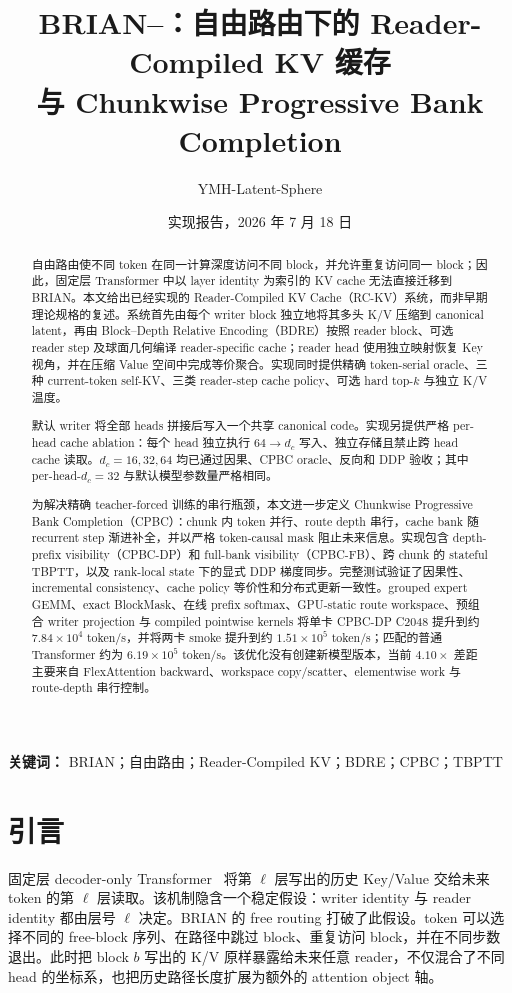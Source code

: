\documentclass[UTF8,twocolumn,10pt,a4paper]{ctexart}
\title{\vspace{-1.0em}\textbf{BRIAN--\RCKV{}：自由路由下的 Reader-Compiled KV 缓存\\与 Chunkwise Progressive Bank Completion}}
\author{YMH-Latent-Sphere}
\date{实现报告，2026 年 7 月 18 日}
\newcommand{\RCKV}{\textsf{RC-KV}}
\newcommand{\BDRE}{\textsf{BDRE}}
\newcommand{\CPBC}{\textsf{CPBC}}
\newcommand{\DP}{\textsf{CPBC-DP}}
\newcommand{\FB}{\textsf{CPBC-FB}}
\begin{document}
\maketitle
\vspace{-1.55em}

\begin{abstract}
自由路由使不同 token 在同一计算深度访问不同 block，并允许重复访问同一 block；因此，固定层 Transformer 中以 layer identity 为索引的 KV cache 无法直接迁移到 BRIAN。本文给出已经实现的 Reader-Compiled KV Cache（\RCKV{}）系统，而非早期理论规格的复述。系统首先由每个 writer block 独立地将其多头 K/V 压缩到 canonical latent，再由 Block--Depth Relative Encoding（\BDRE{}）按照 reader block、可选 reader step 及球面几何编译 reader-specific cache；reader head 使用独立映射恢复 Key 视角，并在压缩 Value 空间中完成等价聚合。实现同时提供精确 token-serial oracle、三种 current-token self-KV、三类 reader-step cache policy、可选 hard top-$k$ 与独立 K/V 温度。

默认 writer 将全部 heads 拼接后写入一个共享 canonical code。实现另提供严格 per-head cache ablation：每个 head 独立执行 $64\rightarrow d_c$ 写入、独立存储且禁止跨 head cache 读取。$d_c=16,32,64$ 均已通过因果、CPBC oracle、反向和 DDP 验收；其中 per-head-$d_c=32$ 与默认模型参数量严格相同。

为解决精确 teacher-forced 训练的串行瓶颈，本文进一步定义 Chunkwise Progressive Bank Completion（\CPBC{}）：chunk 内 token 并行、route depth 串行，cache bank 随 recurrent step 渐进补全，并以严格 token-causal mask 阻止未来信息。实现包含 depth-prefix visibility（\DP{}）和 full-bank visibility（\FB{}）、跨 chunk 的 stateful TBPTT，以及 rank-local state 下的显式 DDP 梯度同步。完整测试验证了因果性、incremental consistency、cache policy 等价性和分布式更新一致性。grouped expert GEMM、exact BlockMask、在线 prefix softmax、GPU-static route workspace、预组合 writer projection 与 compiled pointwise kernels 将单卡 \DP{} C2048 提升到约 $7.84\times10^4$ token/s，并将两卡 smoke 提升到约 $1.51\times10^5$ token/s；匹配的普通 Transformer 约为 $6.19\times10^5$ token/s。该优化没有创建新模型版本，当前 $4.10\times$ 差距主要来自 FlexAttention backward、workspace copy/scatter、elementwise work 与 route-depth 串行控制。
\end{abstract}

\noindent\textbf{关键词：} BRIAN；自由路由；Reader-Compiled KV；BDRE；CPBC；TBPTT

\section{引言}
固定层 decoder-only Transformer~\cite{vaswani2017attention} 将第 $\ell$ 层写出的历史 Key/Value 交给未来 token 的第 $\ell$ 层读取。该机制隐含一个稳定假设：writer identity 与 reader identity 都由层号 $\ell$ 决定。BRIAN 的 free routing 打破了此假设。token 可以选择不同的 free-block 序列、在路径中跳过 block、重复访问 block，并在不同步数退出。此时把 block $b$ 写出的 K/V 原样暴露给未来任意 reader，不仅混合了不同 head 的坐标系，也把历史路径长度扩展为额外的 attention object 轴。
\end{document}
